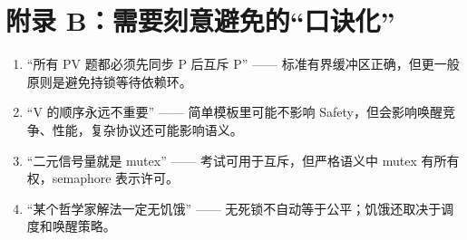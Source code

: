 \documentclass[11pt,a4paper]{ctexart}
\begin{document}
\section*{附录 B：需要刻意避免的“口诀化”}

\begin{warn}[四句不应绝对化的话]
\begin{enumerate}
\item “所有 PV 题都必须先同步 P 后互斥 P” —— 标准有界缓冲区正确，但更一般原则是避免持锁等待依赖环。
\item “V 的顺序永远不重要” —— 简单模板里可能不影响 Safety，但会影响唤醒竞争、性能，复杂协议还可能影响语义。
\item “二元信号量就是 mutex” —— 考试可用于互斥，但严格语义中 mutex 有所有权，semaphore 表示许可。
\item “某个哲学家解法一定无饥饿” —— 无死锁不自动等于公平；饥饿还取决于调度和唤醒策略。
\end{enumerate}
\end{warn}
\end{document}
